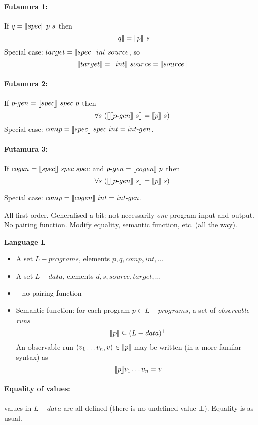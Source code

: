 \documentclass[11pt,fleqn]{article}
\newcommand{\lsem}{\mbox{$\lbrack\hspace{-0.3ex}\lbrack$}}
\newcommand{\rsem}{\mbox{$\rbrack\hspace{-0.3ex}\rbrack$}}
\newcommand{\bc}{\begin{center}}
\newcommand{\ec}{\end{center}}
\newcommand{\bi}{\begin{itemize}}
\newcommand{\ei}{\end{itemize}}
\newcommand{\pg}[1]{\paragraph{#1}}
\begin{document}
\pg{Futamura 1:}  If $q =  \lsem spec\rsem\ p\ s  $
 then 
$$
\lsem q \rsem =  \lsem p\rsem\ s
 $$
Special case: $target =  \lsem spec\rsem\ int\ source  $, so
$$
\lsem target\rsem = \lsem int\rsem\ source = \lsem source\rsem
$$
\vspace{5mm}

\pg{Futamura 2:}  If $p\mbox{-}gen =  \lsem spec\rsem\ spec\ p  $
 then 
$$
\forall s\ (
\lsem \lsem p\mbox{-}gen\rsem\ s \rsem =  \lsem p\rsem\ s )
 $$
Special case: $comp =  \lsem spec\rsem\ spec\ int  = int\mbox{-}gen$.

 \vspace{5mm}

\pg{Futamura 3:} If $cogen =  \lsem spec\rsem\ spec\ spec  $
and $p\mbox{-}gen =  \lsem cogen\rsem\ p $ then 
$$
\forall s\ (
\lsem \lsem p\mbox{-}gen\rsem\ s \rsem =  \lsem p\rsem\ s )
 $$



Special case: $comp =  \lsem cogen\rsem\ int  = int\mbox{-}gen$.

\newpage




\bc{}
\ec



All first-order. Generalised a bit: not necessarily {\em one} program input and output.
No pairing function. Modify equality, semantic function, etc. (all the way).


\vspace{5mm}

{\bf Language L} 
\bi
\item A set $L-programs$, elements $p, q, comp, int,\ldots$
\item A set $L-data$, elements $d, s, source, target,\ldots$

\item -- no pairing function --
\item Semantic function: for each program $p \in L-programs$, a set of {\em observable runs}
$$
\lsem p\rsem  \subseteq (L-data)^+
$$
An observable run $(v_1\ldots v_n, v) \in \lsem p\rsem$  may be written (in a more familar syntax)
as
$$\lsem p\rsem v_1\ldots v_n = v
$$

\ei





\pg{Equality of values:} values in $L-data$ are all defined (there is no undefined value $\bot$). Equality is as usual.
\end{document}
